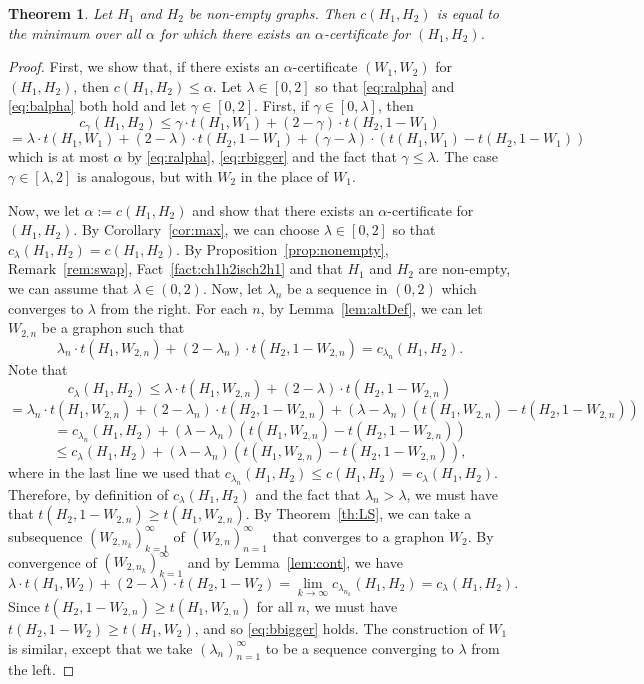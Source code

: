 \documentclass[12pt]{article}
\numberwithin{equation}{section}
\newtheorem{thm}[equation]{Theorem}
\theoremstyle{definition}
\theoremstyle{remark}
\begin{document}
\begin{thm}
\label{th:dual}
Let $H_1$ and $H_2$ be non-empty graphs. Then $c(H_1,H_2)$ is equal to the minimum over all $\alpha$ for which there exists an $\alpha$-certificate for $(H_1,H_2)$. 
\end{thm}

\begin{proof}
First, we show that, if there exists an $\alpha$-certificate $(W_1,W_2)$ for $(H_1,H_2)$, then $c(H_1,H_2)\leq \alpha$. Let $\lambda\in [0,2]$ so that \eqref{eq:ralpha} and \eqref{eq:balpha} both hold and let $\gamma\in[0,2]$. First, if $\gamma\in [0,\lambda]$, then
\[c_\gamma(H_1,H_2) \leq \gamma\cdot t(H_1,W_1) + (2-\gamma)\cdot t(H_2,1-W_1)\]
\[=\lambda\cdot t(H_1,W_1) + (2-\lambda)\cdot t(H_2,1-W_1) + (\gamma-\lambda)\cdot \left(t(H_1,W_1) -t(H_2,1-W_1)\right)\]
which is at most $\alpha$ by \eqref{eq:ralpha}, \eqref{eq:rbigger} and the fact that $\gamma\leq \lambda$. The case $\gamma\in[\lambda,2]$ is analogous, but with $W_2$ in the place of $W_1$.

Now, we let $\alpha:=c(H_1,H_2)$ and show that there exists an $\alpha$-certificate for $(H_1,H_2)$. By Corollary~\ref{cor:max}, we can choose $\lambda\in[0,2]$ so that $c_\lambda(H_1,H_2)=c(H_1,H_2)$. By Proposition~\ref{prop:nonempty}, Remark~\ref{rem:swap}, Fact~\ref{fact:ch1h2isch2h1} and that $H_1$ and $H_2$ are non-empty, we can assume that $\lambda\in (0,2)$. Now, let $\lambda_n$ be a sequence in $(0,2)$ which converges to $\lambda$ from the right. For each $n$, by Lemma~\ref{lem:altDef}, we can let $W_{2,n}$ be a graphon such that
\[\lambda_n\cdot t(H_1,W_{2,n}) + (2-\lambda_n)\cdot t(H_2,1-W_{2,n})=c_{\lambda_n}(H_1,H_2).\] 
Note that
\[c_{\lambda}(H_1, H_2) \leq \lambda\cdot t(H_1,W_{2,n}) + (2-\lambda)\cdot t(H_2,1-W_{2,n})\] 
\[=\lambda_n\cdot t(H_1,W_{2,n}) + (2-\lambda_n)\cdot t(H_2,1-W_{2,n}) + (\lambda-\lambda_n)(t(H_1,W_{2,n}) - t(H_2,1-W_{2,n}))\]
\[=c_{\lambda_n}(H_1,H_2) + (\lambda-\lambda_n)(t(H_1,W_{2,n}) - t(H_2,1-W_{2,n}))\]
\[\leq c_\lambda(H_1,H_2)+ (\lambda-\lambda_n)(t(H_1,W_{2,n}) - t(H_2,1-W_{2,n})),\] where in the last line we used that $c_{\lambda_n}(H_1, H_2) \leq c(H_1, H_2) = c_{\lambda}(H_1, H_2)$.
Therefore, by definition of $c_\lambda(H_1,H_2)$ and the fact that $\lambda_n>\lambda$, we must have that $t(H_2,1-W_{2,n})\geq t(H_1,W_{2,n})$. By Theorem~\ref{th:LS}, we can take a subsequence $(W_{2,n_k})_{k=1}^\infty$ of $(W_{2,n})_{n=1}^\infty$ that converges to a graphon $W_{2}$. By convergence of $(W_{2,n_k})_{k=1}^\infty$ and by Lemma~\ref{lem:cont}, we have
\[\lambda\cdot t(H_1,W_2)+(2-\lambda)\cdot t(H_2,1-W_2) = \lim_{k\to\infty}c_{\lambda_{n_k}}(H_1,H_2) = c_\lambda(H_1,H_2).\]
Since $t(H_2,1-W_{2,n})\geq t(H_1,W_{2,n})$ for all $n$, we must have $t(H_2,1-W_{2})\geq t(H_1,W_{2})$, and so \eqref{eq:bbigger} holds. The construction of $W_1$ is similar, except that we take $(\lambda_n)_{n=1}^\infty$ to be a sequence converging to $\lambda$ from the left. 
\end{proof}
\end{document}
